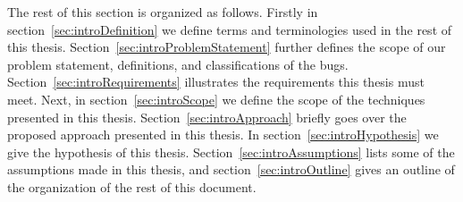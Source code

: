 The rest of this section is organized as follows.
Firstly in section~\ref{sec:introDefinition} we define terms and terminologies used in the rest of this thesis.
Section~\ref{sec:introProblemStatement} further defines the scope of our problem statement, definitions, and classifications of the bugs.
Section~\ref{sec:introRequirements} illustrates the requirements this thesis must meet.
Next, in section~\ref{sec:introScope} we define the scope of the techniques presented in this thesis.
Section~\ref{sec:introApproach} briefly goes over the proposed approach presented in this thesis.
In section~\ref{sec:introHypothesis} we give the hypothesis of this thesis.
Section~\ref{sec:introAssumptions} lists some of the assumptions made in this thesis, and section~\ref{sec:introOutline} gives an outline of the organization of the rest of this document.








